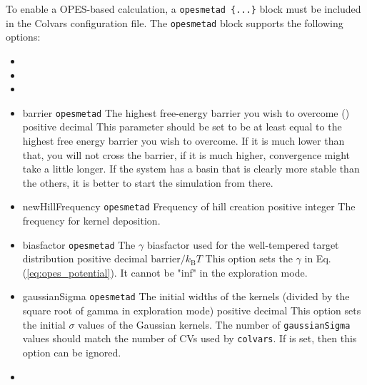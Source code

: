 To enable a OPES-based calculation, a \texttt{opes{\textunderscore}metad \{...\}} block must be included in the Colvars configuration file. The \texttt{opes{\textunderscore}metad} block supports the following options:
\begin{itemize}
\item {}
\item {}
\item {}
\item %
  \key
    {barrier}{%
    \texttt{opes{\textunderscore}metad}}{%
    The highest free-energy barrier you wish to overcome (\energyunit)}{%
    positive decimal}{%
    This parameter should be set to be at least equal to the highest free energy barrier you wish to overcome. If it is much lower than that, you will not cross the barrier, if it is much higher, convergence might take a little longer. If the system has a basin that is clearly more stable than the others, it is better to start the simulation from there.}
\item %
  \key
    {newHillFrequency}{%
    \texttt{opes{\textunderscore}metad}}{%
    Frequency of hill creation}{%
    positive integer}{%
    The frequency for kernel deposition.}
\item %
  \keydef
    {biasfactor}{%
    \texttt{opes{\textunderscore}metad}}{%
    The $\gamma$ biasfactor used for the well-tempered target distribution}{%
    positive decimal}{%
    $\mathrm{barrier} / k_{\mathrm{B}} T$}{%
    This option sets the $\gamma$ in Eq.(\ref{eq:opes_potential}). It cannot be "inf" in the exploration mode.}
\item %
  \key
    {gaussianSigma}{%
    \texttt{opes{\textunderscore}metad}}{%
    The initial widths of the kernels (divided by the square root of gamma in exploration mode)}{%
    positive decimal}{%
    This option sets the initial $\sigma$ values of the Gaussian kernels. The number of \texttt{gaussianSigma} values should match the number of CVs used by \texttt{colvars}. If  is set, then this option can be ignored.}
\item %

\end{itemize}
